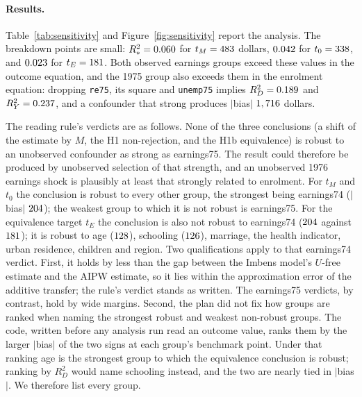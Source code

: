 \documentclass[11pt]{article}
\newcommand{\var}[1]{\texttt{#1}}
\begin{document}
\paragraph{Results.} Table~\ref{tab:sensitivity} and Figure~\ref{fig:sensitivity} report the
analysis. The breakdown points are small: $R^2_* = 0.060$ for $t_M =
483$ dollars, $0.042$ for $t_0 = 338$, and $0.023$
for $t_E = 181$. Both observed earnings groups exceed these values in the outcome
equation, and the 1975 group also exceeds them in the enrolment equation: dropping
\var{re75}, its square and \var{unemp75} implies $R^2_D = 0.189$ and
$R^2_Y = 0.237$, and a confounder that strong produces $|$bias$|$
$1,716$ dollars.

The reading rule's verdicts are as follows. None of the three conclusions (a shift of the
estimate by $M$, the H1 non-rejection, and the H1b equivalence) is robust to an unobserved
confounder as strong as earnings75. The result could therefore be produced by unobserved
selection of that strength, and an unobserved 1976 earnings shock is plausibly at least that
strongly related to enrolment. For $t_M$ and $t_0$ the conclusion is robust to every other
group, the strongest being earnings74 ($|$bias$|$ $204$); the
weakest group to which it is not robust is earnings75. For the equivalence target $t_E$ the
conclusion is also not robust to earnings74 ($204$ against
$181$); it is robust to age ($128$), schooling
($126$), marriage, the health indicator, urban residence, children and region.
Two qualifications apply to that earnings74 verdict. First, it holds by less than the gap
between the Imbens model's $U$-free estimate and the AIPW estimate, so it lies within the
approximation error of the additive transfer; the rule's verdict stands as written. The
earnings75 verdicts, by contrast, hold by wide margins. Second, the plan did not fix how
groups are ranked when naming the strongest robust and weakest non-robust groups. The code,
written before any analysis run read an outcome value, ranks them by the larger $|$bias$|$ of the two signs at
each group's benchmark point. Under that ranking age is the strongest group to which the
equivalence conclusion is robust; ranking by $R^2_D$ would name schooling instead, and the
two are nearly tied in $|$bias$|$. We therefore list every group.
\end{document}
